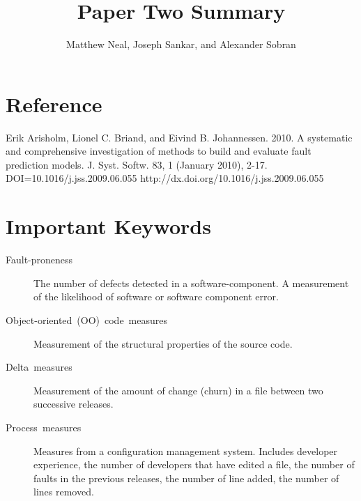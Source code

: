 \documentclass[english]{article}
\begin{document}
\title{Paper Two Summary}


\author{Matthew Neal, Joseph Sankar, and Alexander Sobran}

\maketitle

\section*{Reference}

Erik Arisholm, Lionel C. Briand, and Eivind B. Johannessen. 2010. A systematic and comprehensive investigation of methods to build and evaluate fault prediction models. J. Syst. Softw. 83, 1 (January 2010), 2-17. DOI=10.1016/j.jss.2009.06.055 http://dx.doi.org/10.1016/j.jss.2009.06.055


\section*{Important Keywords}
\begin{description}
\item [{Fault-proneness}] The number of defects detected in a software-component. A measurement of the likelihood of software or software component error.
\item [{Object-oriented~(OO)~code~measures}] Measurement of the structural properties of the source code.
\item [{Delta~measures}] Measurement of the amount of change (churn) in a file between two successive releases.
\item [{Process~measures}] Measures from a configuration management system. Includes developer experience, the number of developers that have edited a file, the number of faults in the previous releases, the number of line added, the number of lines removed.

\end{description}
	
\end{document}
